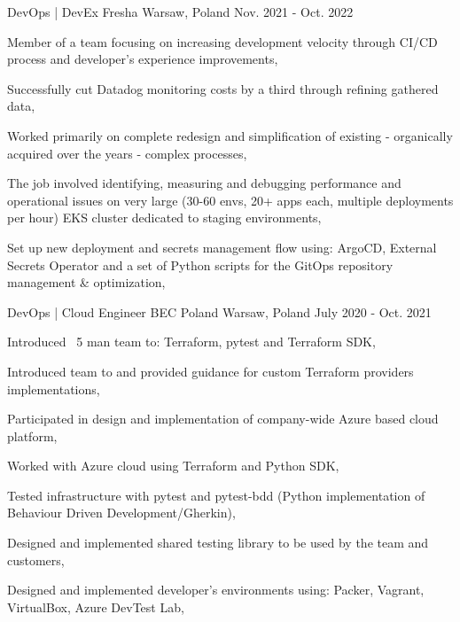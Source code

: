 \begin{cventries}
  \cventry
  {DevOps | DevEx } %
  {Fresha} %
  {Warsaw, Poland} %
  {Nov. 2021 - Oct. 2022} %
  {
    \begin{cvitems} %
      \item {Member of a team focusing on increasing development velocity through CI/CD process and developer's experience improvements,}
      \item {Successfully cut Datadog monitoring costs by a third through refining gathered data,}
      \item {Worked primarily on complete redesign and simplification of existing - organically acquired over the years - complex processes,}
      \item {The job involved identifying, measuring and debugging performance and operational issues on very large (30-60 envs, 20+ apps each, multiple deployments per hour) EKS cluster dedicated to staging environments,}
      \item {Set up new deployment and secrets management flow using: ArgoCD, External Secrets Operator and a set of Python scripts for the GitOps repository management \& optimization,}
    \end{cvitems}
  }

  \cventry
  {DevOps | Cloud Engineer} %
  {BEC Poland} %
  {Warsaw, Poland} %
  {July 2020 - Oct. 2021} %
  {
    \begin{cvitems} %
      \item {Introduced ~5 man team to: Terraform, pytest and Terraform SDK,}
      \item {Introduced team to and provided guidance for custom Terraform providers implementations,}
      \item {Participated in design and implementation of company-wide Azure based cloud platform,}
      \item {Worked with Azure cloud using Terraform and Python SDK,}
      \item {Tested infrastructure with pytest and pytest-bdd (Python implementation of Behaviour Driven Development/Gherkin),}
      \item {Designed and implemented shared testing library to be used by the team and customers,}
      \item {Designed and implemented developer's environments using: Packer, Vagrant, VirtualBox, Azure DevTest Lab,}
    \end{cvitems}
  }


\end{cventries}
